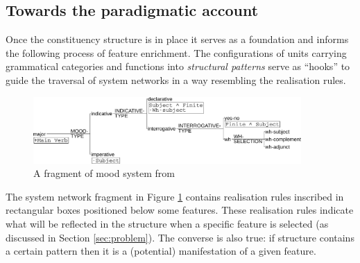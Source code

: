 
\subsection{Towards the paradigmatic account}
\label{sec:paradigmatic-account}
    Once the constituency structure is in place it serves as a foundation and informs the following process of feature enrichment. The configurations of units carrying grammatical categories and functions into \textit{structural patterns} serve as ``hooks'' to guide the traversal of system networks in a way resembling the realisation rules. %

    \begin{figure}[!ht]
        \centering      
        \includegraphics[width=0.91\textwidth]{Figures/Example/just-mood.pdf}      
        \caption{A fragment of mood system from \citet[366]{Halliday2013}}
        \label{fig:just-mood}
    \end{figure}
    
    The system network fragment in Figure \ref{fig:just-mood} contains realisation rules inscribed in rectangular boxes positioned below some features. These realisation rules indicate what will be reflected in the structure when a specific feature is selected (as discussed in Section \ref{sec:problem}). The converse is also true: if structure contains a certain pattern then it is a (potential) manifestation of a given feature. 

